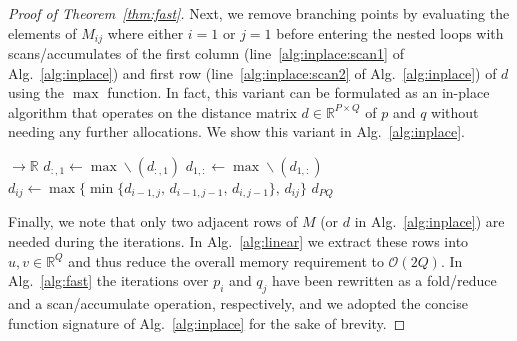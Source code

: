 \begin{proof}[Proof of Theorem~\ref{thm:fast}]
Next, we remove branching points by evaluating the elements of $M_{ij}$ where either $i=1$ or $j=1$ before entering the nested loops with scans/accumulates of the first column (line~\ref{alg:inplace:scan1} of Alg.~\ref{alg:inplace}) and first row (line~\ref{alg:inplace:scan2} of Alg.~\ref{alg:inplace}) of $d$ using the $\max$ function.
In fact, this variant can be formulated as an in-place algorithm that operates on the distance matrix $d \in \mathbb{R}^{P \times Q}$ of $p$ and $q$ without needing any further allocations.
We show this variant in Alg.~\ref{alg:inplace}.

\begin{algorithm}
    \caption{In-place variant of Alg.~\ref{alg:vanilla}. This variant directly maps a given distance matrix $d_{ij} = \|p_i - q_j\|_\mathcal{S}$  to the corresponding Fr\'echet distance. Note that this variant has no explicit branching points.}
    \label{alg:inplace}
    \begin{algorithmic}[1]
         $\to \mathbb{R}$
            \State $d_{:,1} \gets \max\!\backslash(d_{:,1})$ \label{alg:inplace:scan1}
            \State $d_{1,:} \gets \max\!\backslash(d_{1,:})$ \label{alg:inplace:scan2}
            \Statex
                    \State $d_{ij} \gets \max\{\min\{d_{i-1,j},\, d_{i-1,j-1},\, d_{i,j-1}\},\, d_{ij} \}$
                \EndFor
            \EndFor
            \Statex
            \State \Return $d_{PQ}$   
        \EndFunction
    \end{algorithmic}
\end{algorithm}

Finally, we note that only two adjacent rows of $M$ (or $d$ in Alg.~\ref{alg:inplace}) are needed during the iterations.
In Alg.~\ref{alg:linear} we extract these rows into $u,v \in \mathbb{R}^Q$ and thus reduce the overall memory requirement to $\mathcal{O}(2Q)$.
In Alg.~\ref{alg:fast} the iterations over $p_i$ and $q_j$ have been rewritten as a fold/reduce and a scan/accumulate operation, respectively, and we adopted the concise function signature of Alg.~\ref{alg:inplace} for the sake of brevity.


\end{proof}
